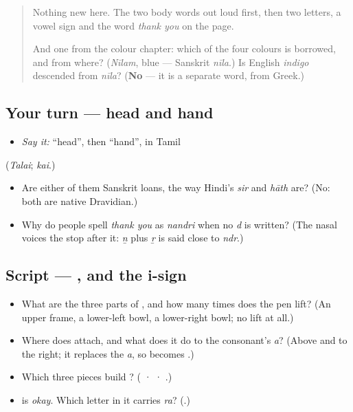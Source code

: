 \label{lesson:TA-C13-checkpoint}



\begin{quote}
Nothing new here. The two body words out loud first, then two letters, a vowel sign and the word \emph{thank you} on the page.

And one from the colour chapter: which of the four colours is borrowed, and from where? (\emph{Nīlam}, blue — Sanskrit \emph{nīla}.) Is English \emph{indigo} descended from \emph{nīla}? (\textbf{No} — it is a separate word, from Greek.)
\end{quote}

\subsection*{Your turn — head and hand}
\begin{itemize}
\raggedright
  \item \emph{Say it:} \textquotedblleft{}head\textquotedblright{}, then \textquotedblleft{}hand\textquotedblright{}, in Tamil
\end{itemize}

(\emph{Talai}; \emph{kai}.)

\begin{itemize}
\raggedright
  \item Are either of them Sanskrit loans, the way Hindi's \emph{sir} and \emph{hāth} are? (No: both are native Dravidian.)
  \item Why do people spell \emph{thank you} as \emph{nandri} when no \emph{d} is written? (The nasal voices the stop after it: \emph{ṉ} plus \emph{ṟ} is said close to \emph{ndr}.)
\end{itemize}

\subsection*{Script — ,  and the i-sign}
\begin{itemize}
\raggedright
  \item What are the three parts of \textbf{}, and how many times does the pen lift? (An upper frame, a lower-left bowl, a lower-right bowl; no lift at all.)
  \item Where does \textbf{} attach, and what does it do to the consonant's \emph{a}? (Above and to the right; it replaces the \emph{a}, so \textbf{} becomes \textbf{}.)
  \item Which three pieces build \textbf{}? (\textbf{} · \textbf{} · \textbf{}.)
  \item \textbf{} is \emph{okay}. Which letter in it carries \emph{ra}? (\textbf{}.)
\end{itemize}

